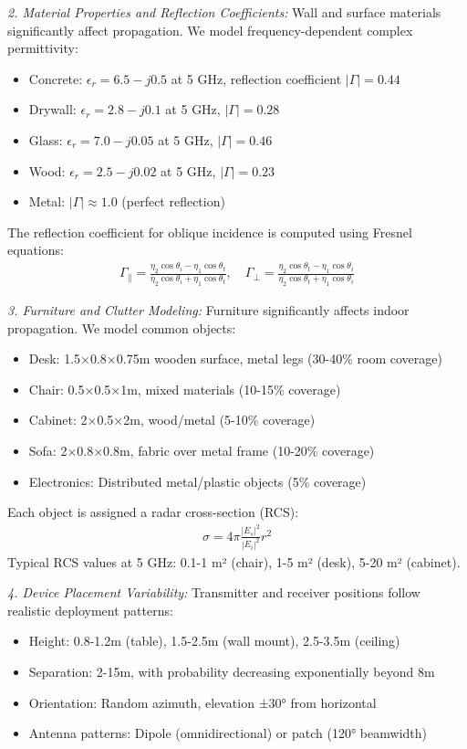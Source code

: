 \documentclass[journal]{IEEEtran}
\begin{document}
\textit{2. Material Properties and Reflection Coefficients:}
Wall and surface materials significantly affect propagation. We model frequency-dependent complex permittivity:
\begin{itemize}
\item Concrete: $\epsilon_r = 6.5 - j0.5$ at 5 GHz, reflection coefficient $|\Gamma| = 0.44$
\item Drywall: $\epsilon_r = 2.8 - j0.1$ at 5 GHz, $|\Gamma| = 0.28$
\item Glass: $\epsilon_r = 7.0 - j0.05$ at 5 GHz, $|\Gamma| = 0.46$
\item Wood: $\epsilon_r = 2.5 - j0.02$ at 5 GHz, $|\Gamma| = 0.23$
\item Metal: $|\Gamma| \approx 1.0$ (perfect reflection)
\end{itemize}

The reflection coefficient for oblique incidence is computed using Fresnel equations:
\begin{align}
\Gamma_{\parallel} = \frac{\eta_2 \cos\theta_i - \eta_1 \cos\theta_t}{\eta_2 \cos\theta_i + \eta_1 \cos\theta_t}, \quad
\Gamma_{\perp} = \frac{\eta_2 \cos\theta_t - \eta_1 \cos\theta_i}{\eta_2 \cos\theta_t + \eta_1 \cos\theta_i}
\end{align}

\textit{3. Furniture and Clutter Modeling:}
Furniture significantly affects indoor propagation. We model common objects:
\begin{itemize}
\item Desk: 1.5×0.8×0.75m wooden surface, metal legs (30-40\% room coverage)
\item Chair: 0.5×0.5×1m, mixed materials (10-15\% coverage)
\item Cabinet: 2×0.5×2m, wood/metal (5-10\% coverage)
\item Sofa: 2×0.8×0.8m, fabric over metal frame (10-20\% coverage)
\item Electronics: Distributed metal/plastic objects (5\% coverage)
\end{itemize}

Each object is assigned a radar cross-section (RCS):
\begin{align}
\sigma = 4\pi \frac{|E_s|^2}{|E_i|^2} r^2
\end{align}
Typical RCS values at 5 GHz: 0.1-1 m² (chair), 1-5 m² (desk), 5-20 m² (cabinet).

\textit{4. Device Placement Variability:}
Transmitter and receiver positions follow realistic deployment patterns:
\begin{itemize}
\item Height: 0.8-1.2m (table), 1.5-2.5m (wall mount), 2.5-3.5m (ceiling)
\item Separation: 2-15m, with probability decreasing exponentially beyond 8m
\item Orientation: Random azimuth, elevation ±30° from horizontal
\item Antenna patterns: Dipole (omnidirectional) or patch (120° beamwidth)
\end{itemize}
\end{document}
